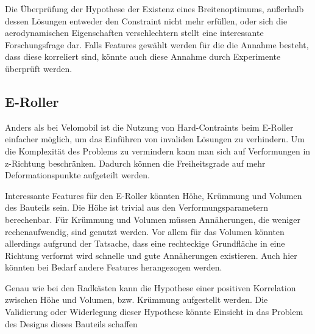 \documentclass[12pt]{article}
\begin{document}
Die Überprüfung der Hypothese der Existenz eines Breitenoptimums, außerhalb dessen Lösungen entweder den Constraint nicht mehr erfüllen, oder sich die aerodynamischen Eigenschaften verschlechtern stellt eine interessante Forschungsfrage dar.
Falls Features gewählt werden für die die Annahme besteht, dass diese korreliert sind, könnte auch diese Annahme durch Experimente überprüft werden.

\subsection{E-Roller}
Anders als bei Velomobil ist die Nutzung von Hard-Contraints beim E-Roller einfacher möglich, um das Einführen von invaliden Lösungen zu verhindern.
Um die Komplexität des Problems zu vermindern kann man sich auf Verformungen in z-Richtung beschränken.
Dadurch können die Freiheitsgrade auf mehr Deformationspunkte aufgeteilt werden.

Interessante Features für den E-Roller könnten Höhe, Krümmung und Volumen des Bauteils sein.
Die Höhe ist trivial aus den Verformungsparametern berechenbar.
Für Krümmung und Volumen müssen Annäherungen, die weniger rechenaufwendig, sind genutzt werden.
Vor allem für das Volumen könnten allerdings aufgrund der Tatsache, dass eine rechteckige Grundfläche in eine Richtung verformt wird schnelle und gute Annäherungen existieren.
Auch hier könnten bei Bedarf andere Features herangezogen werden.

Genau wie bei den Radkästen kann die Hypothese einer positiven Korrelation zwischen Höhe und Volumen, bzw. Krümmung aufgestellt werden.
Die Validierung oder Widerlegung dieser Hypothese könnte Einsicht in das Problem des Designs dieses Bauteils schaffen
\end{document}

